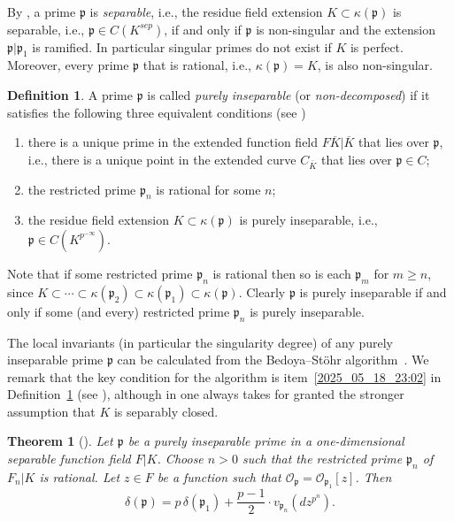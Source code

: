 \documentclass[12pt,reqno]{amsart}%
\newtheorem{thm}[prop]{Theorem}
\theoremstyle{definition}
\newtheorem{defn}[prop]{Definition}
\theoremstyle{remark}
\newcommand{\su}{\subset}
\newcommand{\ov}{\overline}
\newcommand{\OO}{\mathcal{O}}
\newcommand{\pp}{\mathfrak{p}}
\newcommand{\de}{\delta}
\newcommand{\ka}{\kappa}
\begin{document}
By \cite[Proposition~2.9]{HiSt22}, a prime $\pp$ is \emph{separable}, i.e., the residue field extension $K \su \ka(\pp)$ is separable, i.e., $\pp \in C(K^{sep})$, if and only if $\pp$ is non-singular and the extension $\pp|\pp_1$ is ramified.
In particular singular primes do not exist if $K$ is perfect.
Moreover, every prime $\pp$ that is rational, i.e., $\ka(\pp)=K$, is also non-singular.

\begin{defn}\label{2025_05_18_23:00}
A prime $\pp$ is called \emph{purely inseparable} (or \emph{non-decomposed}) if it satisfies the following three equivalent conditions (see \cite[Corollary~2.17]{HiSt22})
\begin{enumerate}[\upshape (i)]
    \item there is a unique prime in the extended function field $F \ov K | \ov K$ that lies over $\pp$, i.e., there is a unique point in the extended curve $C_{\ov K}$ that lies over $\pp \in C$;
    \item \label{2025_05_18_23:02}
    the restricted prime $\pp_n$ is rational for some $n$;
    \item \label{2025_05_18_23:03}
    the residue field extension $K \su \ka(\pp)$ is purely inseparable, i.e., $\pp \in C(K^{p^{-\infty}})$.
\end{enumerate}
\end{defn}
Note that if some restricted prime $\pp_n$ is rational then so is each $\pp_m$ for $m\geq n$, since 
$K \su \cdots \su \ka(\pp_2) \su \ka(\pp_{1}) \su \ka(\pp)$.
Clearly $\pp$ is purely inseparable if and only if some (and every) restricted prime $\pp_n$ is purely inseparable.

The local invariants (in particular the singularity degree) of any purely inseparable prime $\pp$ can be calculated from the Bedoya--Stöhr algorithm~\cite{BedSt87}.
We remark that the key condition for the algorithm is item~\ref{2025_05_18_23:02} in Definition~\ref{2025_05_18_23:00} (see \cite[p.\,313]{BedSt87}), although in \cite{BedSt87} one always takes for granted the stronger assumption that $K$ is separably closed.

\begin{thm}[{\cite[Theorem 2.3]{BedSt87}}] \label{2024_01_21_02:30}
Let $\pp$ be a purely inseparable prime in a one-dimensional separable function field $F|K$.
Choose $n>0$ such that the restricted prime $\pp_n$ %
of $F_n|K$ is rational.
Let $z\in F$ be a function such that $\OO_\pp = \OO_{\pp_1}[z]$.
Then
\[ \de(\pp) = p \, \de(\pp_1) + \frac{p-1}2 \cdot v_{\pp_n} (dz^{p^n}). \]
\end{thm}
\end{document}
